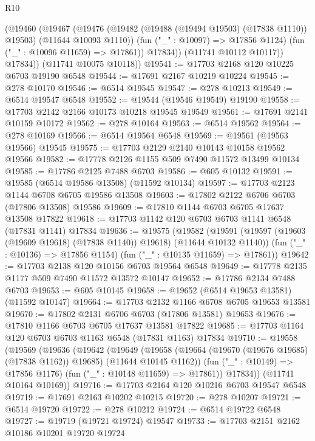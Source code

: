 \begin{lexlean}{R10}
\begin{coremodule}
              (@19460
                (@19467
                  (@19476
                    (@19482 (@19488 (@19494 @19503) (@17838 @1110)) @19503)
                    (@11644 @10093 @1110))
                  (fun ("_" : @10097) => @17856 @1124)
                  (fun ("_" : @10096 @11659) => @17861))
                @17834))
            (@11741 @10112 @10117))
          @17834))
      (@11741 @10075 @10118))
@19541 := @17703 @2168 @120 @10225 @6703 @19190 @6548
@19544 := @17691 @2167 @10219 @10224
@19545 := @278 @10170
@19546 := @6514 @19545
@19547 := @278 @10213
@19549 := @6514 @19547 @6548
@19552 := @19544 (@19546 @19549) @19190
@19558 := @17703 @2142 @2166 @10173 @10218 @19545 @19549
@19561 := @17691 @2141 @10159 @10172
@19562 := @278 @10164
@19563 := @6514 @19562
@19564 := @278 @10169
@19566 := @6514 @19564 @6548
@19569 := @19561 (@19563 @19566) @19545
@19575 := @17703 @2129 @2140 @10143 @10158 @19562 @19566
@19582 := @17778 @2126 @1155 @509 @7490 @11572 @13499 @10134
@19585 := @17786 @2125 @7488 @6703
@19586 := @605 @10132
@19591 := @19585 (@6514 @19586 @13508) (@11592 @10134)
@19597 := @17703 @2123 @1144 @6708 @6705 @19586 @13508
@19603 := @17802 @2122 @6706 @6703 (@17806 @13508) @19586
@19609 := @17810 @1144 @6703 @6705 @17637 @13508 @17822
@19618 := @17703 @1142 @120 @6703 @6703 @1141 @6548 (@17831 @1141) @17834
@19636 := @19575
    (@19582
      (@19591 (@19597 (@19603 (@19609 @19618) (@17838 @1140)) @19618) (@11644 @10132 @1140))
      (fun ("_" : @10136) => @17856 @1154)
      (fun ("_" : @10135 @11659) => @17861))
@19642 := @17703 @2138 @120 @10156 @6703 @19564 @6548
@19649 := @17778 @2135 @1177 @509 @7490 @11572 @13572 @10147
@19652 := @17786 @2134 @7488 @6703
@19653 := @605 @10145
@19658 := @19652 (@6514 @19653 @13581) (@11592 @10147)
@19664 := @17703 @2132 @1166 @6708 @6705 @19653 @13581
@19670 := @17802 @2131 @6706 @6703 (@17806 @13581) @19653
@19676 := @17810 @1166 @6703 @6705 @17637 @13581 @17822
@19685 := @17703 @1164 @120 @6703 @6703 @1163 @6548 (@17831 @1163) @17834
@19710 := @19558
    (@19569
      (@19636
        (@19642
          (@19649
            (@19658 (@19664 (@19670 (@19676 @19685) (@17838 @1162)) @19685) (@11644 @10145 @1162))
            (fun ("_" : @10149) => @17856 @1176)
            (fun ("_" : @10148 @11659) => @17861))
          @17834))
      (@11741 @10164 @10169))
@19716 := @17703 @2164 @120 @10216 @6703 @19547 @6548
@19719 := @17691 @2163 @10202 @10215
@19720 := @278 @10207
@19721 := @6514 @19720
@19722 := @278 @10212
@19724 := @6514 @19722 @6548
@19727 := @19719 (@19721 @19724) @19547
@19733 := @17703 @2151 @2162 @10186 @10201 @19720 @19724

\end{coremodule}
\end{lexlean}
